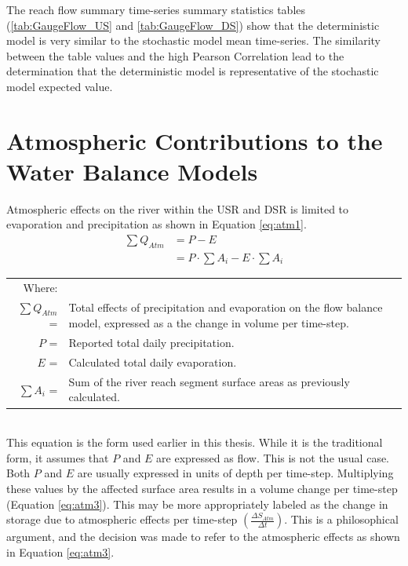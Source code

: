 The reach flow summary time-series summary statistics tables (\ref{tab:GaugeFlow_US} and \ref{tab:GaugeFlow_DS}) show that the deterministic model is very similar to the stochastic model mean time-series.  The similarity between the table values and the high Pearson Correlation lead to the determination that the deterministic model is representative of the stochastic model expected value.  


\section{Atmospheric Contributions to the Water Balance Models}
Atmospheric effects on the river within the USR and DSR is limited to evaporation and precipitation as shown in Equation \ref{eq:atm1}.
\begin{align}
	\label{eq:atm1}
	\sum Q_{Atm}&=P-E\\
		\label{eq:atm2}
		& = P \cdot \sum A_i - E \cdot \sum A_i
\end{align}
\begin{tabular}{r p{5in}}
	Where:& \\
	$ \displaystyle \sum Q_{Atm} $ = & Total effects of precipitation and evaporation on the flow balance model, expressed as a the change in volume per time-step.\\ 
	$ P $ = & Reported total daily precipitation.\\
	$ E $ = & Calculated total daily evaporation.\\
	$ \displaystyle \sum A_i  $ = & Sum of the river reach segment surface areas as previously calculated. \\
\end{tabular}\\

This equation is the form used earlier in this thesis.  While it is the traditional form, it assumes that $ P $ and $ E $ are expressed as flow.  This is not the usual case.  Both $ P $ and $ E $ are usually expressed in units of depth per time-step.  Multiplying these values by the affected surface area results in a volume change per time-step (Equation \ref{eq:atm3}).  This may be more appropriately labeled as the change in storage due to atmospheric effects per time-step $ \displaystyle \left( \frac{\Delta S_{Atm}}{\Delta t} \right) $.  This is a philosophical argument, and the decision was made to refer to the atmospheric effects as shown in Equation \ref{eq:atm3}.

